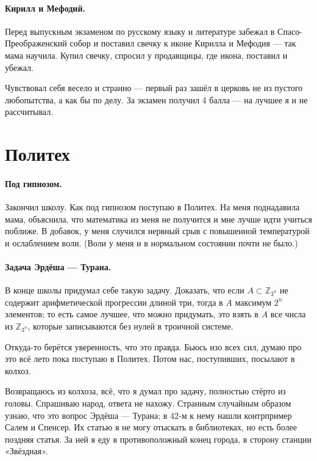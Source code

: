 \documentclass{book}
\begin{document}
\paragraph{Кирилл и Мефодий.}
Перед выпускным экзаменом по русскому языку и литературе забежал в Спасо-Преображенский собор и поставил свечку к иконе Кирилла и Мефодия --- так мама научила.
Купил свечку, спросил у продавщицы, где икона, поставил и убежал.

Чувствовал себя весело и странно --- первый раз зашёл в церковь не из пустого любопытства, а как бы по делу.
За экзамен получил 4 балла --- на лучшее я и не рассчитывал.

\section*{Политех}

\paragraph{Под гипнозом.}
Закончил школу.
Как под гипнозом поступаю в Политех.
На меня поднадавила мама, объяснила, что математика из меня не получится и мне лучше идти учиться поближе.
В добавок, у меня случился нервный срыв с повышенной температурой и ослаблением воли.
(Воли у меня и в нормальном состоянии почти не было.) 

\paragraph{Задача Эрдёша --- Турана.}
В конце школы придумал себе такую задачу.
Доказать, что если $A\subset\mathbb{Z}_{3^n}$ не содержит арифметической прогрессии длиной три, тогда в $A$ максимум $2^n$ элементов;
то есть самое лучшее, 
что можно придумать, это  взять в $A$ все числа из $\mathbb{Z}_{3^n}$, 
которые записываются без нулей в троичной системе.

Откуда-то берётся уверенность, что это правда.
Бьюсь изо всех сил, думаю про это всё лето пока поступаю в Политех.
Потом нас, поступивших, посылают в колхоз.

Возвращаюсь из колхоза, всё, что я думал про задачу, полностью стёрто из головы.
Спрашиваю народ, ответа не нахожу.
Странным случайным образом узнаю,
что это вопрос Эрдёша --- Турана;
в 42-м к нему нашли контрпример Салем и Спенсер.
Их статью я не могу отыскать в библиотеках, но есть более поздняя статья. 
За ней я еду в противоположный конец города, в сторону станции «Звёздная».
\end{document}
